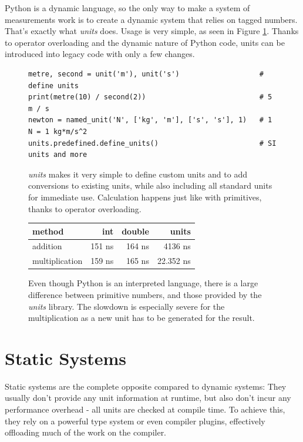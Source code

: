 \documentclass[12pt,oneside,a4paper]{scrbook}
\theoremstyle{definition}
\begin{document}
Python is a dynamic language, so the only way to make a system of measurements work is to create a dynamic system that relies on tagged numbers. That's exactly what \emph{units} \citep{Donohue12} does. Usage is very simple, as seen in Figure \ref{code:python_units}. Thanks to operator overloading and the dynamic nature of Python code, units can be introduced into legacy code with only a few changes.

\begin{figure}
\begin{verbatim}
metre, second = unit('m'), unit('s')                   # define units
print(metre(10) / second(2))                           # 5 m / s
newton = named_unit('N', ['kg', 'm'], ['s', 's'], 1)   # 1 N = 1 kg*m/s^2
units.predefined.define_units()                        # SI units and more
\end{verbatim}
\caption{\emph{units} makes it very simple to define custom units and to add conversions to existing units, while also including all standard units for immediate use. Calculation happens just like with primitives, thanks to operator overloading.}
\label{code:python_units}
\end{figure}



\begin{figure}
\begin{tabular}{lrrr}
method          & int    & double  & units \\
\midrule
addition        & 151 ns &  164 ns    &   4136 ns \\
multiplication  & 159 ns &  165 ns    &   22.352 ns
\end{tabular}
\caption{Even though Python is an interpreted language, there is a large difference between primitive numbers, and those provided by the \emph{units} library. The slowdown is especially severe for the multiplication as a new unit has to be generated for the result.}
\label{bench:python_units}
\end{figure}


\section{Static Systems}

Static systems are the complete opposite compared to dynamic systems: They usually don't provide any unit information at runtime, but also don't incur any performance overhead - all units are checked at compile time. To achieve this, they rely on a powerful type system or even compiler plugins, effectively offloading much of the work on the compiler.
\end{document}
